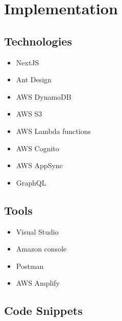 %
%
\chapter{Implementation}%
%
\label{chapter:implementation}

\section{Technologies} 

\begin{itemize}
  \item NextJS
  \item Ant Design
  \item AWS DynamoDB
  \item AWS S3
  \item AWS Lambda functions
  \item AWS Cognito
  \item AWS AppSync
  \item GraphQL
\end{itemize}

\section{Tools} 

\begin{itemize}
  \item Visual Studio
  \item Amazon console
  \item Postman
  \item AWS Amplify
\end{itemize}

\clearpage

\section{Code Snippets} 

